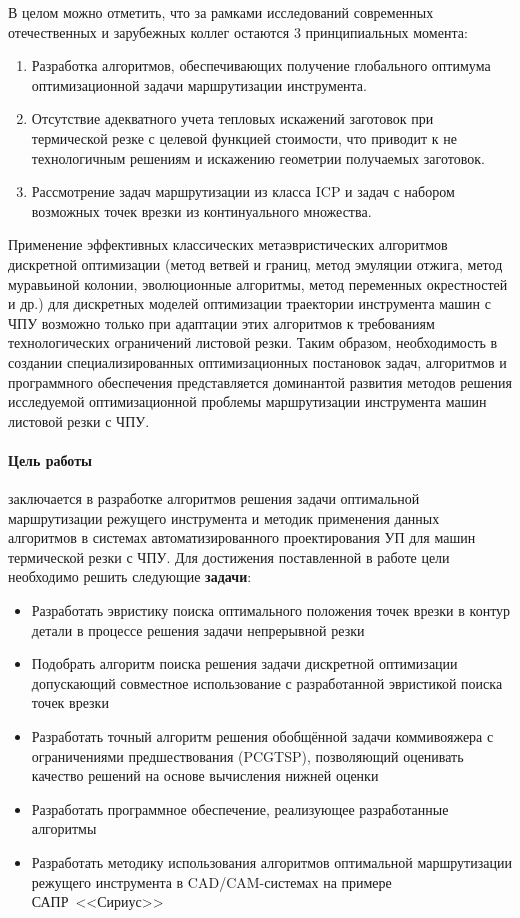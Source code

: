 В целом можно отметить,
что за рамками исследований современных отечественных и зарубежных коллег остаются 3 принципиальных момента:
\begin{enumerate}
    \item
    Разработка алгоритмов, обеспечивающих получение глобального оптимума
    оптимизационной задачи маршрутизации инструмента.
    \item
    Отсутствие адекватного учета тепловых искажений заготовок при термической резке
    с целевой функцией стоимости, что приводит к не технологичным решениям
    и искажению геометрии получаемых заготовок.
    \item
    Рассмотрение задач маршрутизации из класса ICP
    и задач с набором возможных точек врезки из континуального множества.
\end{enumerate}

Применение эффективных классических метаэвристических алгоритмов дискретной оптимизации
(метод ветвей и границ, метод эмуляции отжига, метод муравьиной колонии, эволюционные алгоритмы, метод переменных окрестностей и др.)
для дискретных моделей оптимизации траектории инструмента машин с ЧПУ
возможно только при адаптации этих алгоритмов к требованиям технологических ограничений листовой резки.
Таким образом,
необходимость в создании специализированных оптимизационных постановок задач,
алгоритмов и программного обеспечения представляется
доминантой развития методов решения исследуемой оптимизационной проблемы
маршрутизации инструмента машин листовой резки с ЧПУ.

\paragraph*{Цель работы}
заключается в разработке алгоритмов решения задачи оптимальной
маршрутизации режущего инструмента
и методик применения данных алгоритмов
в системах автоматизированного проектирования УП для машин термической резки с ЧПУ.
Для достижения поставленной в работе цели необходимо решить следующие
\textbf{задачи}:

\begin{itemize}
    \item
    Разработать эвристику поиска оптимального положения
    точек врезки в контур детали в процессе решения задачи
    непрерывной резки
    \item
    Подобрать алгоритм поиска решения задачи дискретной оптимизации
    допускающий совместное использование
    с разработанной эвристикой поиска точек врезки
    \item
    Разработать точный алгоритм решения
    обобщённой задачи коммивояжера
    с ограничениями предшествования (PCGTSP),
    позволяющий оценивать качество решений
    на основе вычисления нижней оценки
    \item
    Разработать программное обеспечение,
    реализующее разработанные алгоритмы
    \item
    Разработать методику использования алгоритмов
    оптимальной маршрутизации режущего инструмента
    в CAD/CAM-системах на примере САПР~<<Сириус>>
\end{itemize}

